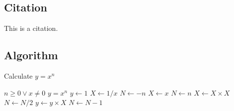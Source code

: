 \documentclass{article}
\begin{document}
\subsection{Citation}

This is a citation\cite{Silver2016Mastering,Mnih2015Human,pmlr-v48-mniha16}.


\subsection{Algorithm}

\begin{algorithm}
	\caption{Calculate $y = x^n$}
	\label{alg1}
	\begin{algorithmic}
		\REQUIRE $n \geq 0 \vee x \neq 0$
		\ENSURE $y = x^n$
		\STATE $y \leftarrow 1$
		\STATE $X \leftarrow 1 / x$
		\STATE $N \leftarrow -n$
		\ELSE
		\STATE $X \leftarrow x$
		\STATE $N \leftarrow n$
		\ENDIF
		\STATE $X \leftarrow X \times X$
		\STATE $N \leftarrow N / 2$
		\ELSE[$N$ is odd]
		\STATE $y \leftarrow y \times X$
		\STATE $N \leftarrow N - 1$
		\ENDIF
		\ENDWHILE
	\end{algorithmic}
\end{algorithm}






\end{document}
